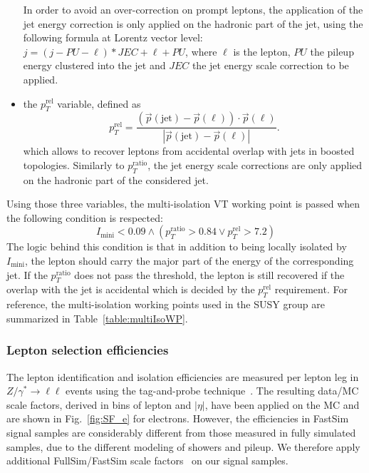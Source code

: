 \begin{itemize}
              In order to avoid an over-correction on prompt leptons, the application of the jet energy correction is only applied on the hadronic part of the jet, using the 
              following formula at Lorentz vector level: $j = (j - PU - \ell)*JEC + \ell + PU$, where $\ell$ is the lepton, 
              $PU$ the pileup energy clustered into the jet and $JEC$ the jet energy scale correction to be applied.
        \item the $p_T^\text{rel}$ variable, defined as
              \begin{equation}
                p_T^\text{rel} = \frac{\left(\vec{p}(\text{jet})-\vec{p}(\ell)\right) \cdot \vec{p}(\ell)}{|\vec{p}(\text{jet})-\vec{p}(\ell)|}.
              \end{equation}
              which allows to recover leptons from accidental overlap with jets in boosted topologies. Similarly to $p_T^\text{ratio}$, the jet energy scale corrections are only applied on the hadronic part of
              the considered jet.
      \end{itemize}
      Using those three variables, the multi-isolation VT working point is passed when the following condition is respected:
      \begin{equation}
        I_\text{mini} < 0.09 \wedge ( p_T^\text{ratio} > 0.84 \vee p_T^\text{rel} > 7.2 )
      \end{equation}
      The logic behind this condition is that in addition to being locally isolated by $I_\text{mini}$, the lepton should carry the major part of the energy of the corresponding jet. If the $p_T^\text{ratio}$ does
      not pass the threshold, the lepton is still recovered if the overlap with the jet is accidental which is decided by the $p_T^\text{rel}$ requirement.
      For reference, the multi-isolation working points used in the SUSY group are summarized in Table~\ref{table:multiIsoWP}.
      
    \subsubsection{Lepton selection efficiencies}
      The lepton identification and isolation efficiencies are measured per lepton leg in $Z/\gamma^*\rightarrow \ell\ell$ events using the tag-and-probe technique~\cite{twiki:SF}.
      The resulting data/MC scale factors, derived in bins of lepton \pt and $|\eta|$, have been applied on the MC and are shown in Fig.~\ref{fig:SF_e} for electrons.
      However, the efficiencies in FastSim signal samples are considerably different from those measured in fully simulated samples, due to the different modeling of showers and pileup.
      We therefore apply additional FullSim/FastSim scale factors~\citep{twiki:FSSF} on our signal samples.


